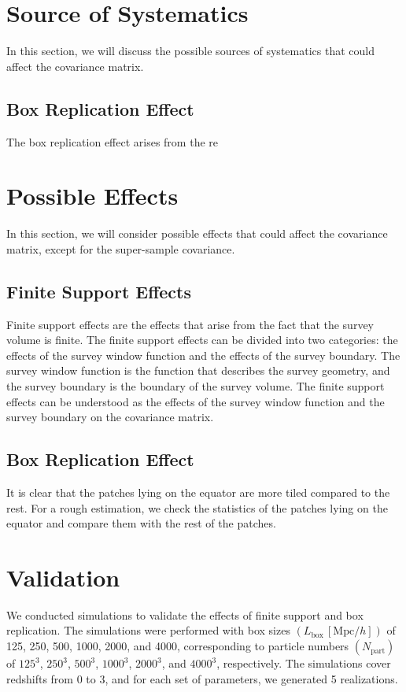 \section{Source of Systematics}
In this section, we will discuss the possible sources of systematics that could affect the covariance matrix. 

\subsection{Box Replication Effect}
The box replication effect arises from the re



\section{Possible Effects}
In this section, we will consider possible effects that could affect the covariance matrix, except for the super-sample covariance.
\subsection{Finite Support Effects}
Finite support effects are the effects that arise from the fact that the survey volume is finite. The finite support effects can be divided into two categories: the effects of the survey window function and the effects of the survey boundary. The survey window function is the function that describes the survey geometry, and the survey boundary is the boundary of the survey volume. The finite support effects can be understood as the effects of the survey window function and the survey boundary on the covariance matrix.

\subsection{Box Replication Effect}
It is clear that the patches lying on the equator are more tiled compared to the rest. For a rough estimation, we check the statistics of the patches lying on the equator and compare them with the rest of the patches.

\section{Validation}
We conducted simulations to validate the effects of finite support and box replication. The simulations were performed with box sizes $(L_{\text{box}}\, [\mathrm{Mpc}/h])$ of 125, 250, 500, 1000, 2000, and 4000, corresponding to particle numbers $(N_{\text{part}})$ of $125^3$, $250^3$, $500^3$, $1000^3$, $2000^3$, and $4000^3$, respectively. The simulations cover redshifts from $0$ to $3$, and for each set of parameters, we generated 5 realizations.

